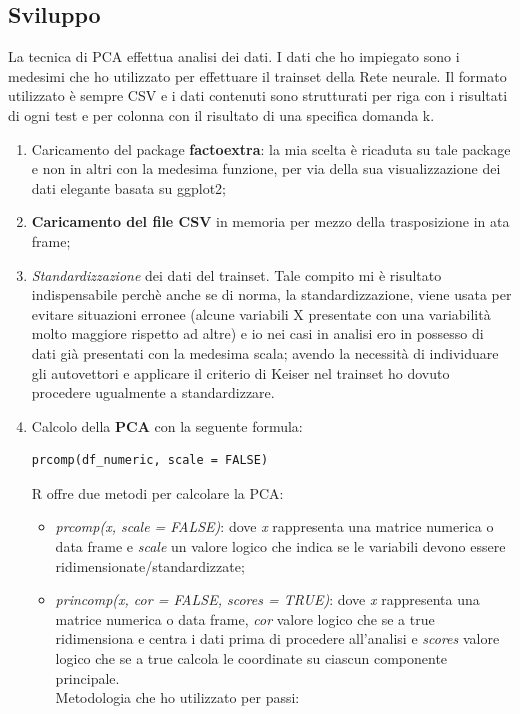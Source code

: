 \subsection{Sviluppo}
\label{Sviluppo}
La tecnica di PCA effettua analisi dei dati. I dati che ho impiegato sono i medesimi che ho utilizzato per effettuare il trainset della Rete neurale. Il formato utilizzato \`e sempre CSV e i dati contenuti sono strutturati per riga con  i risultati di ogni test e per colonna con il risultato di una specifica domanda k.
\begin{enumerate}
\item Caricamento del package \textbf{factoextra}: la mia scelta \`e ricaduta su tale package e non in altri con la medesima funzione, per via della sua  visualizzazione dei dati elegante basata su ggplot2;
\item \textbf{Caricamento del file CSV} in memoria per mezzo della trasposizione in ata frame;
\item \textit{Standardizzazione} dei dati del trainset. Tale compito mi \`e risultato indispensabile  perch\`e anche se di norma, la standardizzazione, viene usata per evitare situazioni erronee (alcune variabili X presentate con una variabilit\`a molto maggiore rispetto ad altre) e io nei casi in analisi ero in possesso di dati gi\`a presentati con la medesima scala;  avendo la necessit\`a di individuare gli autovettori e  applicare il criterio di Keiser nel trainset ho dovuto procedere ugualmente a standardizzare.
\item Calcolo della \textbf{PCA} con la seguente formula:
\begin{verbatim}
prcomp(df_numeric, scale = FALSE) 
\end{verbatim}
R offre due metodi per calcolare la PCA: 
\begin{itemize}
\item \textit{prcomp(x, scale = FALSE)}: dove \textit{x} rappresenta una matrice numerica o data frame e \textit{scale} un valore logico che indica se le variabili devono essere ridimensionate/standardizzate;
\item \textit{princomp(x, cor = FALSE, scores = TRUE)}: dove \textit{x} rappresenta una matrice numerica o data frame, \textit{cor} valore logico che se a true ridimensiona e centra i dati prima di procedere all'analisi e \textit{scores} valore logico che se a true calcola le coordinate su ciascun componente principale.\\
Metodologia che ho utilizzato per passi:
\end{itemize}

\end{enumerate}
